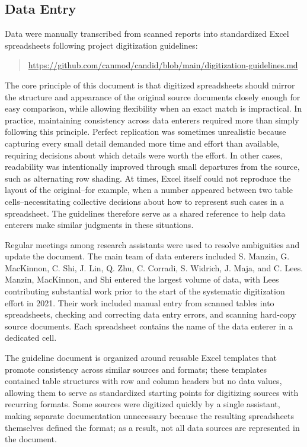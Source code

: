 \documentclass[12pt]{article}
\begin{document}
\subsection{Data Entry}\label{sec:appendix-data-entry}

Data were manually transcribed from scanned reports into standardized Excel spreadsheets following project digitization guidelines:

\begin{quote}
\url{https://github.com/canmod/candid/blob/main/digitization-guidelines.md}
\end{quote}

The core principle of this document is that digitized spreadsheets should mirror the structure and appearance of the original source documents closely enough for easy comparison, while allowing flexibility when an exact match is impractical. In practice, maintaining consistency across data enterers required more than simply following this principle. Perfect replication was sometimes unrealistic because capturing every small detail demanded more time and effort than available, requiring decisions about which details were worth the effort. In other cases, readability was intentionally improved through small departures from the source, such as alternating row shading. At times, Excel itself could not reproduce the layout of the original--for example, when a number appeared between two table cells--necessitating collective decisions about how to represent such cases in a spreadsheet. The guidelines therefore serve as a shared reference to help data enterers make similar judgments in these situations.

Regular meetings among research assistants were used to resolve ambiguities and update the document. The main team of data enterers included S. Manzin, G. MacKinnon, C. Shi, J. Lin, Q. Zhu, C. Corradi, S. Widrich, J. Maja, and C. Lees. Manzin, MacKinnon, and Shi entered the largest volume of data, with Lees contributing substantial work prior to the start of the systematic digitization effort in 2021. Their work included manual entry from scanned tables into spreadsheets, checking and correcting data entry errors, and scanning hard-copy source documents. Each spreadsheet contains the name of the data enterer in a dedicated cell.

The guideline document is organized around reusable Excel templates that promote consistency across similar sources and formats; these templates contained table structures with row and column headers but no data values, allowing them to serve as standardized starting points for digitizing sources with recurring formats. Some sources were digitized quickly by a single assistant, making separate documentation unnecessary because the resulting spreadsheets themselves defined the format; as a result, not all data sources are represented in the document.
\end{document}
